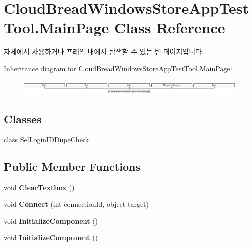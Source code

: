 \hypertarget{a00132}{}\section{Cloud\+Bread\+Windows\+Store\+App\+Test\+Tool.\+Main\+Page Class Reference}
\label{a00132}


자체에서 사용하거나 프레임 내에서 탐색할 수 있는 빈 페이지입니다.  


Inheritance diagram for Cloud\+Bread\+Windows\+Store\+App\+Test\+Tool.\+Main\+Page\+:\begin{figure}[H]
\begin{center}
\leavevmode
\includegraphics[height=0.751678cm]{a00132}
\end{center}
\end{figure}
\subsection*{Classes}
\begin{DoxyCompactItemize}
\item 
class \hyperlink{a00176}{Sel\+Login\+I\+D\+Dupe\+Check}
\end{DoxyCompactItemize}
\subsection*{Public Member Functions}
\begin{DoxyCompactItemize}
\item 
void {\bfseries Clear\+Textbox} ()\hypertarget{a00132_a6a677940306a5b433c5d1affe2a67a64}{}\label{a00132_a6a677940306a5b433c5d1affe2a67a64}

\item 
void {\bfseries Connect} (int connection\+Id, object target)\hypertarget{a00132_a0cc0c40694564a77f1fa4d0643d3c3b7}{}\label{a00132_a0cc0c40694564a77f1fa4d0643d3c3b7}

\item 
void {\bfseries Initialize\+Component} ()\hypertarget{a00132_a0dc19ae72b15d40001334811c71552a4}{}\label{a00132_a0dc19ae72b15d40001334811c71552a4}

\item 
void {\bfseries Initialize\+Component} ()\hypertarget{a00132_a0dc19ae72b15d40001334811c71552a4}{}\label{a00132_a0dc19ae72b15d40001334811c71552a4}

\end{DoxyCompactItemize}


